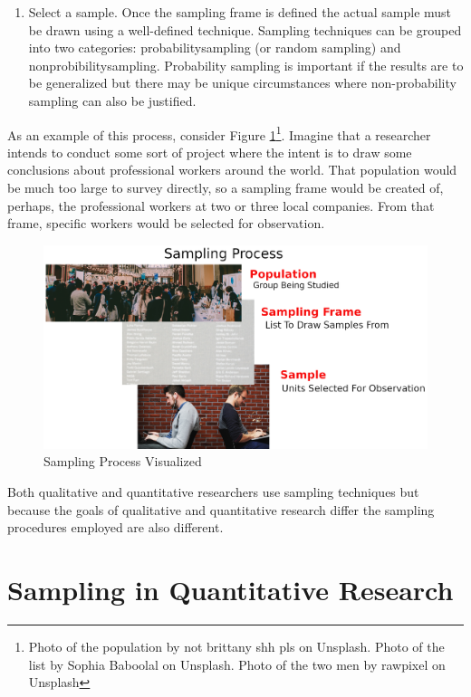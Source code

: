 \begin{enumerate}
	\item Select a sample. Once the sampling frame is defined the actual sample must be drawn using a well-defined technique. Sampling techniques can be grouped into two categories: \gls{probabilitysampling} (or random sampling) and \gls{nonprobibilitysampling}. Probability sampling is important if the results are to be generalized but there may be unique circumstances where non-probability sampling can also be justified.

\end{enumerate}

As an example of this process, consider Figure \ref{07:fig11}\footnote{Photo of the population by not brittany shh pls on Unsplash. Photo of the list by Sophia Baboolal on Unsplash. Photo of the two men by rawpixel on Unsplash}. Imagine that a researcher intends to conduct some sort of project where the intent is to draw some conclusions about professional workers around the world. That population would be much too large to survey directly, so a sampling frame would be created of, perhaps, the professional workers at two or three local companies. From that frame, specific workers would be selected for observation.

\begin{figure}[H]
	\centering
	\includegraphics[width=\maxwidth{.95\linewidth}]{gfx/07-11}
	\caption{Sampling Process Visualized}
	\label{07:fig11}
\end{figure}

Both qualitative and quantitative researchers use sampling techniques but because the goals of qualitative and quantitative research differ the sampling procedures employed are also different.

\section{Sampling in Quantitative Research}

